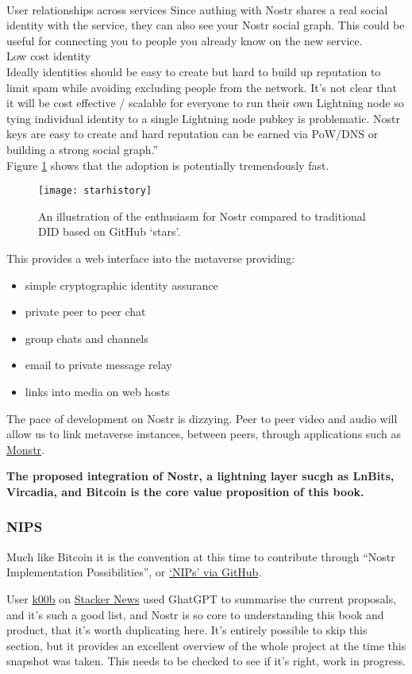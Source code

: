 {\\User relationships across services
Since authing with Nostr shares a real social identity with the service, they can also see your Nostr social graph. This could be useful for connecting you to people you already know on the new service.\\
Low cost identity\\
Ideally identities should be easy to create but hard to build up reputation to limit spam while avoiding excluding people from the network. It's not clear that it will be cost effective / scalable for everyone to run their own Lightning node so tying individual identity to a single Lightning node pubkey is problematic. Nostr keys are easy to create and hard reputation can be earned via PoW/DNS or building a strong social graph.''}\\
Figure \ref{fig:starhistory} shows that the adoption is potentially tremendously fast.
\begin{figure}
\texttt{[image: starhistory]}
  \caption{An illustration of the enthusiasm for Nostr compared to traditional DID based on GitHub `stars'.}
  \label{fig:starhistory}
\end{figure}
This provides a web interface into the metaverse providing:
\begin{itemize}
\item simple cryptographic identity assurance
\item private peer to peer chat
\item group chats and channels
\item email to private message relay
\item links into media on web hosts
\end{itemize}
The pace of development on Nostr is dizzying. Peer to peer video and audio will allow us to link metaverse instances, between peers, through applications such as \href{https://monstr.app/}{Monstr}.\par
\textbf{The proposed integration of Nostr, a lightning layer sucgh as LnBits, Vircadia, and Bitcoin is the core value proposition of this book.}
\subsubsection{NIPS}
Much like Bitcoin it is the convention at this time to contribute through ``Nostr Implementation Possibilities'', or \href{https://github.com/nostr-protocol/nips}{`NIPs' via GitHub}. \par
User \href{https://stacker.news/k00b}{k00b} on \href{https://stacker.news/items/119948}{Stacker News} used GhatGPT to summarise the current proposals, and it's such a good list, and Nostr is so core to understanding this book and product, that it's worth duplicating here. It's entirely possible to skip this section, but it provides an excellent overview of the whole project at the time this snapshot was taken. This needs to be checked to see if it's right, work in progress.

